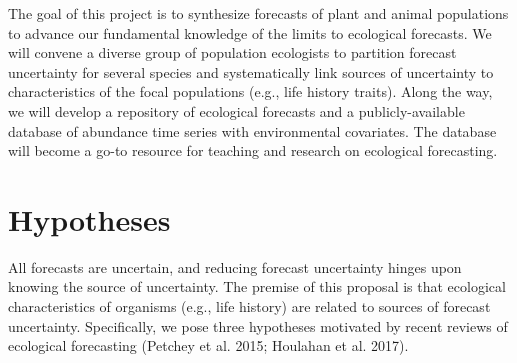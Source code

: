\documentclass[12pt,]{article}
\begin{document}
The goal of this project is to synthesize forecasts of plant and animal
populations to advance our fundamental knowledge of the limits to
ecological forecasts. We will convene a diverse group of population
ecologists to partition forecast uncertainty for several species and
systematically link sources of uncertainty to characteristics of the
focal populations (e.g., life history traits). Along the way, we will
develop a repository of ecological forecasts and a publicly-available
database of abundance time series with environmental covariates. The
database will become a go-to resource for teaching and research on
ecological forecasting.

\section{Hypotheses}

All forecasts are uncertain, and reducing forecast uncertainty hinges
upon knowing the source of uncertainty. The premise of this proposal is
that ecological characteristics of organisms (e.g., life history) are
related to sources of forecast uncertainty. Specifically, we pose three
hypotheses motivated by recent reviews of ecological forecasting
(Petchey et al. 2015; Houlahan et al. 2017).
\end{document}
